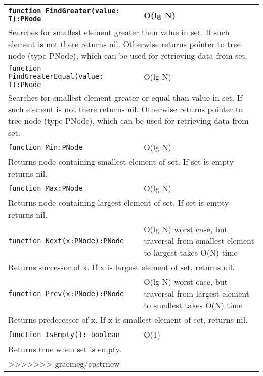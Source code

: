 \begin{longtable}{|m{10cm}|m{5cm}|}
\verb!function FindGreater(value: T):PNode! & O(lg N) \\\hline
\multicolumn{2}{|m{15cm}|}{Searches for smallest element greater than value in set. If such element is not there returns nil. Otherwise
returns pointer to tree node (type PNode), which can be used for retrieving data from set.} \\\hline\hline

\verb!function FindGreaterEqual(value: T):PNode! & O(lg N) \\\hline
\multicolumn{2}{|m{15cm}|}{Searches for smallest element greater or equal than value in set. If such element is not there returns nil. Otherwise
returns pointer to tree node (type PNode), which can be used for retrieving data from set.} \\\hline\hline

\verb!function Min:PNode! & O(lg N) \\\hline
\multicolumn{2}{|m{15cm}|}{Returns node containing smallest element of set. If set is empty returns
nil.} \\\hline\hline

\verb!function Max:PNode! & O(lg N) \\\hline
\multicolumn{2}{|m{15cm}|}{Returns node containing largest element of set. If set is empty returns
nil.} \\\hline\hline

\verb!function Next(x:PNode):PNode! & O(lg N) worst case, but traversal from smallest element to
largest takes O(N) time \\\hline
\multicolumn{2}{|m{15cm}|}{Returns successor of x. If x is largest element of set, returns nil.} \\\hline\hline

\verb!function Prev(x:PNode):PNode! & O(lg N) worst case, but traversal from largest element to
smallest takes O(N) time \\\hline
\multicolumn{2}{|m{15cm}|}{Returns predecessor of x. If x is smallest element of set, returns nil.} \\\hline\hline

\verb!function IsEmpty(): boolean! & O(1) \\ \hline
\multicolumn{2}{|m{15cm}|}{Returns true when set is empty.} \\\hline
>>>>>>> graemeg/cpstrnew

\end{longtable}
